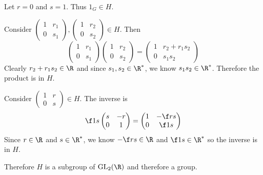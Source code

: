 \documentclass[a4paper]{article}
\begin{document}
Let $r=0$ and $s=1$. Thus $1_G \in H$.

Consider $\begin{pmatrix} 1 & r_1 \\ 0 & s_1 \end{pmatrix}, \begin{pmatrix} 1 & r_2 \\ 0 & s_2 \end{pmatrix} \in H$. Then \[
\begin{pmatrix} 1 & r_1 \\ 0 & s_1 \end{pmatrix} \begin{pmatrix} 1 & r_2 \\ 0 & s_2 \end{pmatrix} = \begin{pmatrix} 1 & r_2 + r_1 s_2 \\ 0 & s_1 s_2 \end{pmatrix}
\] Clearly $r_2 + r_1 s_2 \in \R$ and since $s_1, s_2 \in \R^*$, we know $s_1 s_2 \in \R^*$. Therefore the product is in $H$.

Consider $\begin{pmatrix} 1 & r \\ 0 & s \end{pmatrix} \in H$. The inverse is \[
\f1s \begin{pmatrix} s & -r \\ 0 & 1 \end{pmatrix} = \begin{pmatrix} 1 & -\f rs \\ 0 & \f1s \end{pmatrix}
\] Since $r \in \R$ and $s \in \R^*$, we know $-\f rs \in \R$ and $\f1s \in \R^*$ so the inverse is in $H$.

Therefore $H$ is a subgroup of $\mathrm{GL}_2(\R)$ and therefore a group.

\subsection{~} %
\end{document}
